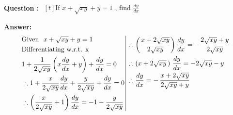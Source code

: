 \documentclass{beamer}
\begin{document}
\frame
{
\textbf{Question :} 
$\begin{aligned}[t] 
\text{If \ } x + \sqrt{xy} + y = 1 \text{\ , \  find \ \  } \frac{dy}{dx}
\end{aligned}$

\textbf{Answer:}
\begin{equation} \nonumber
\begin{alignedat}{4}
& \text{Given \ } x + \sqrt{xy} + y = 1 \\
& \text{Differentiating w.r.t. x \ }\\
& 1 + \frac{1}{2\sqrt{xy}} \left( x\frac{dy}{dx}+y \right)+\frac{dy}{dx}=0 \\
& \therefore 1 + \frac{x}{2\sqrt{xy}} \frac{dy}{dx}+ \frac{y}{2\sqrt{xy}}+\frac{dy}{dx}=0 \\
& \therefore \left(\frac{x}{2\sqrt{xy}}+1\right) \frac{dy}{dx}=-1-\frac{y}{2\sqrt{xy}}\\
\end{alignedat}
\,
\vrule
\, 
\begin{alignedat}{4}
& \therefore \left(\frac{x+2\sqrt{xy}}{2\sqrt{xy}}\right) \frac{dy}{dx}=-\frac{2\sqrt{xy}+y}{2\sqrt{xy}}\\
& \therefore  (x+2\sqrt{xy}\,)\ \frac{dy}{dx}= -2\sqrt{xy}-y \\
& \therefore \frac{dy}{dx} =-\,\frac{x+2\sqrt{xy}}{2\sqrt{xy}+y}  \\
& \\
& \\
\end{alignedat}
\end{equation}


}
\end{document}
